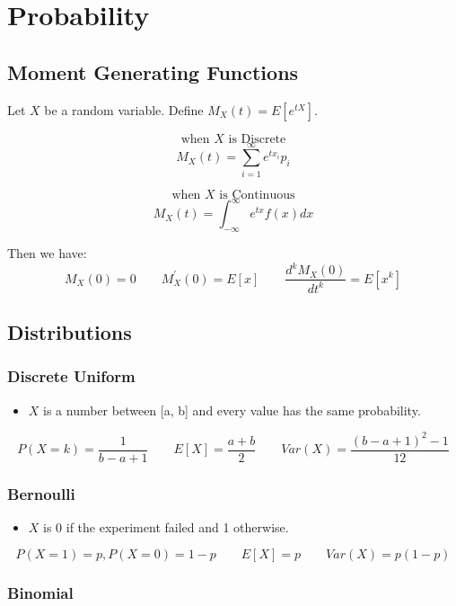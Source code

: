 \section{Probability}

\subsection{Moment Generating Functions}

Let $X$ be a random variable. Define $M_X(t) = E[e^{tX}]$.
\begin{minipage}{.23\textwidth}
$$\text{when }X\text{ is Discrete}$$
$$M_X(t) = \sum_{i=1}^{\infty} e^{tx_i}p_i$$
\end{minipage}
\begin{minipage}{.23\textwidth}
$$\text{when }X \text{ is Continuous}$$
$$M_X(t) = \int_{-\infty}^{\infty} e^{tx}f(x)dx$$
\end{minipage}

Then we have:
$$M_X(0) = 0 \qquad M_{X}^{'}(0) = E[x] \qquad  \frac{d^k M_{X} (0)}{d t^k} = E[x^k]$$

\subsection{Distributions}

\subsubsection{Discrete Uniform}
\begin{itemize}
\item $X$ is a number between [a, b] and every value has the same probability.
\end{itemize}

$$P(X = k) = \frac{1}{b-a+1} \qquad E[X] = \frac{a+b}{2} \qquad Var(X) = \frac{(b-a+1)^2-1}{12}$$

\subsubsection{Bernoulli}
\begin{itemize}
\item $X$ is 0 if the experiment failed and 1 otherwise. 
\end{itemize}

$$P(X = 1) = p, P(X = 0) = 1-p \qquad E[X] = p \qquad Var(X) = p(1-p)$$

\subsubsection{Binomial}

